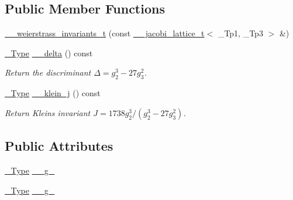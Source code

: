 \subsection*{Public Member Functions}
\begin{DoxyCompactItemize}
\item 
\hyperlink{structstd_1_1____detail_1_1____weierstrass__invariants__t_aeef3f4f3bbb7a950efea23f7c9168091}{\+\_\+\+\_\+weierstrass\+\_\+invariants\+\_\+t} (const \hyperlink{structstd_1_1____detail_1_1____jacobi__lattice__t}{\+\_\+\+\_\+jacobi\+\_\+lattice\+\_\+t}$<$ \+\_\+\+Tp1, \+\_\+\+Tp3 $>$ \&)
\item 
\hyperlink{structstd_1_1____detail_1_1____weierstrass__invariants__t_a9992ab3f07a514203487c0760d76173f}{\+\_\+\+Type} \hyperlink{structstd_1_1____detail_1_1____weierstrass__invariants__t_a8fac51b07dfd6b547eef672d222fda96}{\+\_\+\+\_\+delta} () const
\begin{DoxyCompactList}\small\item\em Return the discriminant $ \Delta = g_2^3 - 27 g_3^2 $. \end{DoxyCompactList}\item 
\hyperlink{structstd_1_1____detail_1_1____weierstrass__invariants__t_a9992ab3f07a514203487c0760d76173f}{\+\_\+\+Type} \hyperlink{structstd_1_1____detail_1_1____weierstrass__invariants__t_a629804c1a1116b22659cca253c4ee117}{\+\_\+\+\_\+klein\+\_\+j} () const
\begin{DoxyCompactList}\small\item\em Return Klein\textquotesingle{}s invariant $ J = 1738 g_2^3 / (g_2^3 - 27 g_3^2) $. \end{DoxyCompactList}\end{DoxyCompactItemize}
\subsection*{Public Attributes}
\begin{DoxyCompactItemize}
\item 
\hyperlink{structstd_1_1____detail_1_1____weierstrass__invariants__t_a9992ab3f07a514203487c0760d76173f}{\+\_\+\+Type} \hyperlink{structstd_1_1____detail_1_1____weierstrass__invariants__t_aca0be8978b83ec9a892cf9b5b39019ec}{\+\_\+\+\_\+g\+\_}
\item 
\hyperlink{structstd_1_1____detail_1_1____weierstrass__invariants__t_a9992ab3f07a514203487c0760d76173f}{\+\_\+\+Type} \hyperlink{structstd_1_1____detail_1_1____weierstrass__invariants__t_a585d9c21b0b189782b58f121cd101289}{\+\_\+\+\_\+g\+\_}
\end{DoxyCompactItemize}


